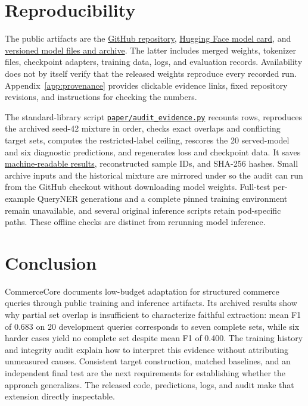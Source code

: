 \documentclass{article}
\begin{document}
\section{Reproducibility}
\label{sec:repro}
The public artifacts are the \href{https://github.com/arghya05/commercecore}{GitHub repository}, \href{https://huggingface.co/arghya2030/commercecore-qwen3-1.7b}{Hugging Face model card}, and \href{https://huggingface.co/arghya2030/commercecore-qwen3-1.7b/tree/425c4a52e6a0e73fd6770ee0918851a132821d3d}{versioned model files and archive}. The latter includes merged weights, tokenizer files, checkpoint adapters, training data, logs, and evaluation records. Availability does not by itself verify that the released weights reproduce every recorded run. Appendix~\ref{app:provenance} provides clickable evidence links, fixed repository revisions, and instructions for checking the numbers.

The standard-library script \href{https://github.com/arghya05/commercecore/blob/main/paper/audit_evidence.py}{\nolinkurl{paper/audit_evidence.py}} recounts rows, reproduces the archived seed-42 mixture in order, checks exact overlaps and conflicting target sets, computes the restricted-label ceiling, rescores the 20 served-model and six diagnostic predictions, and regenerates loss and checkpoint data. It saves \href{https://github.com/arghya05/commercecore/blob/main/paper/evidence/audit_results.json}{machine-readable results}, reconstructed sample IDs, and SHA-256 hashes. Small archive inputs and the historical mixture are mirrored under  so the audit can run from the GitHub checkout without downloading model weights. Full-test per-example QueryNER generations and a complete pinned training environment remain unavailable, and several original inference scripts retain pod-specific paths. These offline checks are distinct from rerunning model inference.

\section{Conclusion}
CommerceCore documents low-budget adaptation for structured commerce queries through public training and inference artifacts. Its archived results show why partial set overlap is insufficient to characterize faithful extraction: mean F1 of 0.683 on 20 development queries corresponds to seven complete sets, while six harder cases yield no complete set despite mean F1 of 0.400. The training history and integrity audit explain how to interpret this evidence without attributing unmeasured causes. Consistent target construction, matched baselines, and an independent final test are the next requirements for establishing whether the approach generalizes. The released code, predictions, logs, and audit make that extension directly inspectable.
\end{document}
